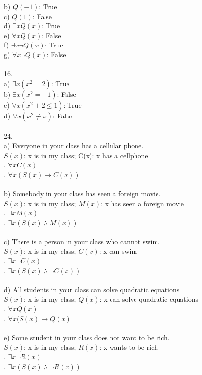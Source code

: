 \documentclass[11pt, oneside]{article}   	%
\begin{document}
\indent b) $Q(-1)$: True\\
\indent c) $Q(1)$: False\\
\indent d) $\exists xQ(x)$: True\\
\indent e) $\forall xQ(x)$: False\\
\indent f) $\exists x\neg Q(x)$: True\\
\indent g) $\forall x\neg Q(x)$: False\\\\
16.\\
\indent a) $\exists x(x^2 = 2)$: True\\
\indent b) $\exists x(x^2 = -1)$: False\\
\indent c) $\forall x(x^2 + 2\leq 1)$: True\\
\indent d) $\forall x(x^2 \neq x)$: False\\\\
24.\\
\indent a) Everyone in your class has a cellular phone.\\
\indent $S(x)$: x is in my class; C(x): x has a cellphone\\
. $\forall xC(x)$\\
. $\forall x(S(x)\to C(x))$\\\\
\indent b) Somebody in your class has seen a foreign movie.\\
\indent $S(x)$: x is in my class; $M(x)$: x has seen a foreign movie\\
. $\exists xM(x)$\\
. $\exists x(S(x)\wedge M(x))$\\\\
\indent c) There is a person in your class who cannot swim.\\
\indent $S(x)$: x is in my class; $C(x)$: x can swim\\
. $\exists x\neg C(x)$\\
. $\exists x(S(x)\wedge\neg C(x))$\\\\
\indent d) All students in your class can solve quadratic equations.\\
\indent $S(x)$: x is in my class; $Q(x)$: x can solve quadratic equations\\
. $\forall xQ(x)$\\
. $\forall x(S(x)\to Q(x)$\\\\
\indent e) Some student in your class does not want to be rich.\\
\indent $S(x)$: x is in my class; $R(x)$: x wants to be rich\\
. $\exists x\neg R(x)$\\
. $\exists x (S(x)\wedge\neg R(x))$\\
\end{document}
